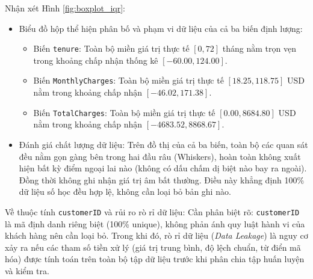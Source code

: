 \documentclass[a4paper]{article}
\begin{document}
{\noindent Nhận xét Hình \ref{fig:boxplot_iqr}:
\begin{itemize}
    \item Biểu đồ hộp thể hiện phân bố và phạm vi dữ liệu của cả ba biến định lượng:
    \begin{itemize}
        \item Biến \texttt{tenure}: Toàn bộ miền giá trị thực tế $[0, 72]$ tháng nằm trọn vẹn trong khoảng chấp nhận thống kê $[-60.00, 124.00]$.
        \item Biến \texttt{MonthlyCharges}: Toàn bộ miền giá trị thực tế $[18.25, 118.75]$ USD nằm trong khoảng chấp nhận $[-46.02, 171.38]$.
        \item Biến \texttt{TotalCharges}: Toàn bộ miền giá trị thực tế $[0.00, 8684.80]$ USD nằm trong khoảng chấp nhận $[-4683.52, 8868.67]$.
    \end{itemize}
    \item Đánh giá chất lượng dữ liệu: Trên đồ thị của cả ba biến, toàn bộ các quan sát đều nằm gọn gàng bên trong hai đầu râu (Whiskers), hoàn toàn không xuất hiện bất kỳ điểm ngoại lai nào (không có dấu chấm dị biệt nào bay ra ngoài). Đồng thời không ghi nhận giá trị âm bất thường. Điều này khẳng định 100\% dữ liệu số học đều hợp lệ, không cần loại bỏ bản ghi nào.
\end{itemize}

\noindent Về thuộc tính \texttt{customerID} và rủi ro rò rỉ dữ liệu: Cần phân biệt rõ: \texttt{customerID} là mã định danh riêng biệt (100\% unique), không phản ánh quy luật hành vi của khách hàng nên cần loại bỏ. Trong khi đó, rò rỉ dữ liệu (\textit{Data Leakage}) là nguy cơ xảy ra nếu các tham số tiền xử lý (giá trị trung bình, độ lệch chuẩn, từ điển mã hóa) được tính toán trên toàn bộ tập dữ liệu trước khi phân chia tập huấn luyện và kiểm tra.

}
\end{document}
